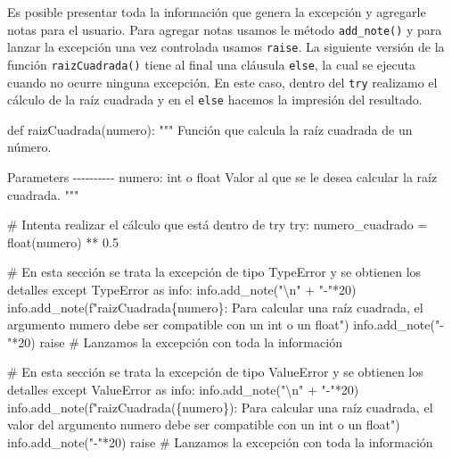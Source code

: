 \documentclass[
  letterpaper,
  DIV=11,
  numbers=noendperiod]{scrreprt}
\newenvironment{Shaded}{\begin{snugshade}}{\end{snugshade}}
\newcommand{\BuiltInTok}[1]{\textcolor[rgb]{0.00,0.23,0.31}{#1}}
\newcommand{\CharTok}[1]{\textcolor[rgb]{0.13,0.47,0.30}{#1}}
\newcommand{\CommentTok}[1]{\textcolor[rgb]{0.37,0.37,0.37}{#1}}
\newcommand{\ControlFlowTok}[1]{\textcolor[rgb]{0.00,0.23,0.31}{#1}}
\newcommand{\DecValTok}[1]{\textcolor[rgb]{0.68,0.00,0.00}{#1}}
\newcommand{\FloatTok}[1]{\textcolor[rgb]{0.68,0.00,0.00}{#1}}
\newcommand{\ImportTok}[1]{\textcolor[rgb]{0.00,0.46,0.62}{#1}}
\newcommand{\KeywordTok}[1]{\textcolor[rgb]{0.00,0.23,0.31}{#1}}
\newcommand{\NormalTok}[1]{\textcolor[rgb]{0.00,0.23,0.31}{#1}}
\newcommand{\OperatorTok}[1]{\textcolor[rgb]{0.37,0.37,0.37}{#1}}
\newcommand{\PreprocessorTok}[1]{\textcolor[rgb]{0.68,0.00,0.00}{#1}}
\newcommand{\SpecialCharTok}[1]{\textcolor[rgb]{0.37,0.37,0.37}{#1}}
\newcommand{\SpecialStringTok}[1]{\textcolor[rgb]{0.13,0.47,0.30}{#1}}
\newcommand{\StringTok}[1]{\textcolor[rgb]{0.13,0.47,0.30}{#1}}
\begin{document}
Es posible presentar toda la información que genera la excepción y
agregarle notas para el usuario. Para agregar notas usamos le método
\texttt{add\_note()} y para lanzar la excepción una vez controlada
usamos \texttt{raise}. La siguiente versión de la función
\texttt{raizCuadrada()} tiene al final una cláusula \texttt{else}, la
cual se ejecuta cuando no ocurre ninguna excepción. En este caso, dentro
del \texttt{try} realizamo el cálculo de la raíz cuadrada y en el
\texttt{else} hacemos la impresión del resultado.

\begin{Shaded}
\begin{Highlighting}[]
\KeywordTok{def}\NormalTok{ raizCuadrada(numero):}
    \CommentTok{"""}
\CommentTok{    Función que calcula la raíz cuadrada de un número.}

\CommentTok{    Parameters}
\CommentTok{    {-}{-}{-}{-}{-}{-}{-}{-}{-}{-}}
\CommentTok{    numero: int o float}
\CommentTok{    Valor al que se le desea calcular la raíz cuadrada.}
\CommentTok{    }
\CommentTok{    """}
    
    \CommentTok{\# Intenta realizar el cálculo que está dentro de try}
    \ControlFlowTok{try}\NormalTok{:}
\NormalTok{        numero\_cuadrado }\OperatorTok{=} \BuiltInTok{float}\NormalTok{(numero) }\OperatorTok{**} \FloatTok{0.5}

    \CommentTok{\# En esta sección se trata la excepción de tipo TypeError y se obtienen los detalles  }
    \ControlFlowTok{except} \PreprocessorTok{TypeError} \ImportTok{as}\NormalTok{ info:}
\NormalTok{        info.add\_note(}\StringTok{"}\CharTok{\textbackslash{}n}\StringTok{"} \OperatorTok{+} \StringTok{"{-}"}\OperatorTok{*}\DecValTok{20}\NormalTok{)}
\NormalTok{        info.add\_note(}\SpecialStringTok{f"raizCuadrada}\SpecialCharTok{\{}\NormalTok{numero}\SpecialCharTok{\}}\SpecialStringTok{: Para calcular una raíz cuadrada, el argumento \textquotesingle{}numero\textquotesingle{} debe ser compatible con un int o un float"}\NormalTok{)}
\NormalTok{        info.add\_note(}\StringTok{"{-}"}\OperatorTok{*}\DecValTok{20}\NormalTok{)}
        \ControlFlowTok{raise} \CommentTok{\# Lanzamos la excepción con toda la información}

    \CommentTok{\# En esta sección se trata la excepción de tipo ValueError y se obtienen los detalles  }
    \ControlFlowTok{except} \PreprocessorTok{ValueError} \ImportTok{as}\NormalTok{ info:}
\NormalTok{        info.add\_note(}\StringTok{"}\CharTok{\textbackslash{}n}\StringTok{"} \OperatorTok{+} \StringTok{"{-}"}\OperatorTok{*}\DecValTok{20}\NormalTok{)}
\NormalTok{        info.add\_note(}\SpecialStringTok{f"raizCuadrada(\textquotesingle{}}\SpecialCharTok{\{}\NormalTok{numero}\SpecialCharTok{\}}\SpecialStringTok{\textquotesingle{}): Para calcular una raíz cuadrada, el valor del argumento \textquotesingle{}numero\textquotesingle{} debe ser compatible con un int o un float"}\NormalTok{)}
\NormalTok{        info.add\_note(}\StringTok{"{-}"}\OperatorTok{*}\DecValTok{20}\NormalTok{)}
        \ControlFlowTok{raise} \CommentTok{\# Lanzamos la excepción con toda la información}
        

\end{Highlighting}
\end{Shaded}
\end{document}
